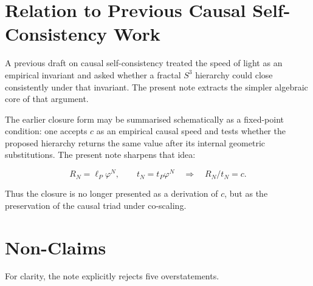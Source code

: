 \documentclass[11pt,a4paper]{article}
\newcommand{\Sthree}{S^{3}}
\newcommand{\lP}{\ell_{P}}
\newcommand{\tP}{t_{P}}
\newcommand{\ph}{\varphi}
\begin{document}
\section{Relation to Previous Causal Self-Consistency Work}

A previous draft on causal self-consistency treated the speed of light as an empirical
invariant and asked whether a fractal $\Sthree$ hierarchy could close consistently
under that invariant.  The present note extracts the simpler algebraic core of that
argument.

The earlier closure form may be summarised schematically as a fixed-point condition:
one accepts $c$ as an empirical causal speed and tests whether the proposed hierarchy
returns the same value after its internal geometric substitutions.  The present note
sharpens that idea:

\[
  R_N=\lP\ph^N,\qquad
  t_N=\tP\ph^N
  \quad\Longrightarrow\quad
  R_N/t_N=c.
\]

Thus the closure is no longer presented as a derivation of $c$, but as the
preservation of the causal triad under co-scaling.

\section{Non-Claims}

For clarity, the note explicitly rejects five overstatements.
\end{document}
